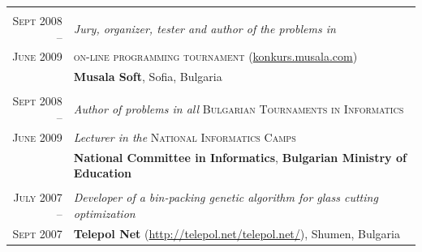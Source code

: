 \documentclass[a4paper,10pt]{article}
\def\myline{\color{linegray}\vline}
\newcommand{\minorcolor}[1]{\textcolor{mygray}{#1}}
\begin{document}
{\begin{tabular}{r!{\myline}p{14cm}}
	\\
	\textsc{Sept 2008 --}     &  \textit{Jury, organizer, tester and \textit{author} of the problems in}\\
	\textsc{June 2009}        &  \textsc{on-line programming tournament} (\href{http://konkurs.musala.com/}{konkurs.musala.com})\\
	                          &  \textbf{Musala Soft}, Sofia, Bulgaria\\

	\\
	\textsc{Sept 2008 --}     &  \textit{Author of problems in all} \textsc{Bulgarian Tournaments in Informatics}\\
	\textsc{June 2009}        &  \textit{Lecturer in the} \textsc{National Informatics Camps}\\
                                  &  \textbf{National Committee in Informatics}, \textbf{Bulgarian Ministry of Education}\\

	\\
	\textsc{July 2007 --}     &  \textit{Developer of a bin-packing genetic algorithm for glass cutting optimization}\\
	\textsc{Sept 2007}        &  \textbf{Telepol Net} (\href{http://telepol.net/telepol.net/}{http://telepol.net/telepol.net/}), Shumen, Bulgaria\\
	
\end{tabular}

}
\end{document}
